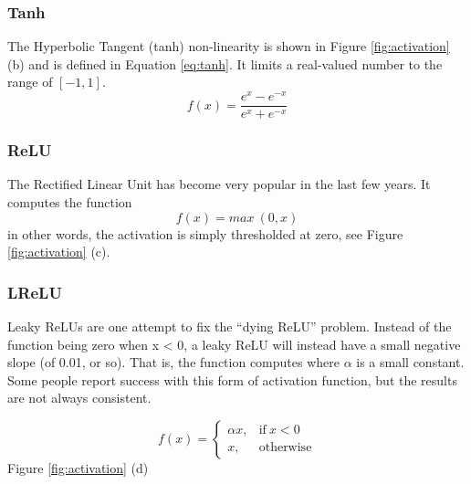\subsubsection{Tanh}

The Hyperbolic Tangent (tanh) non-linearity is shown in Figure \ref{fig:activation} (b) and is defined in Equation \ref{eq:tanh}. It limits a real-valued number to the range of $[-1, 1]$. 
\begin{equation}
f(x) = \frac{e^x - e^{-x}}{e^x + e^{-x}}
\label{eq:tanh}
\end{equation}

\subsubsection{ReLU}

The Rectified Linear Unit has become very popular in the last few years. It computes the function 
\begin{equation}
f(x)=max \: (0,x)
\label{eq:relu}
\end{equation}
in other words, the activation is simply thresholded at zero, see Figure \ref{fig:activation} (c). 

\subsubsection{LReLU}

 Leaky ReLUs are one attempt to fix the “dying ReLU” problem. Instead of the function being zero when x < 0, a leaky ReLU will instead have a small negative slope (of 0.01, or so). That is, the function computes where $\alpha$ is a small constant. Some people report success with this form of activation function, but the results are not always consistent. 

\begin{equation}
f(x)=\begin{cases}
      \alpha x, & \text{if}\ x < 0\\
      x, & \text{otherwise}
    \end{cases}
\label{eq:lrelu}
\end{equation}
Figure \ref{fig:activation} (d)

%
%

